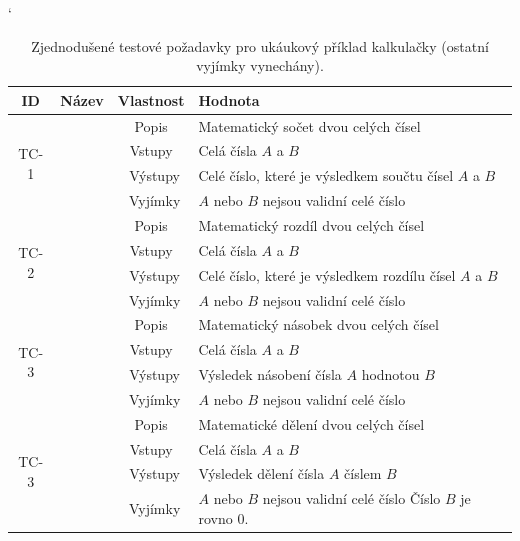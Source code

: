 \documentclass[czech, ma, kiv, he, iso690numb, pdf, viewonly]{fasthesis}
\begin{document}
    \begin{table}
        \catcode`
        \begin{tabular}{|c|c|c|p{7.5cm}|}
            \hline
            \textbf{ID} & \textbf{Název} & \textbf{Vlastnost} & \textbf{Hodnota} \\
            \hline
            \multirow{4}{*}{TC-1} & \multirow{4}{*}{Součet} & Popis & Matematický sočet dvou celých čísel \\
            \cline{3-4}
            & & Vstupy & Celá čísla \(A\) a \(B\) \\
            \cline{3-4}
            & & Výstupy & Celé číslo, které je výsledkem součtu čísel \(A\) a \(B\) \\
            \cline{3-4}
            & & Vyjímky & \(A\) nebo \(B\) nejsou validní celé číslo \\
            \hline
            \multirow{4}{*}{TC-2} & \multirow{4}{*}{Rozdíl} & Popis & Matematický rozdíl dvou celých čísel \\
            \cline{3-4}
            & & Vstupy & Celá čísla \(A\) a \(B\) \\
            \cline{3-4}
            & & Výstupy & Celé číslo, které je výsledkem rozdílu čísel \(A\) a \(B\) \\
            \cline{3-4}
            & & Vyjímky & \(A\) nebo \(B\) nejsou validní celé číslo \\
            \hline
            \multirow{4}{*}{TC-3} & \multirow{4}{*}{Násobení} & Popis & Matematický násobek dvou celých čísel \\
            \cline{3-4}
            & & Vstupy & Celá čísla \(A\) a \(B\) \\
            \cline{3-4}
            & & Výstupy & Výsledek násobení čísla \(A\) hodnotou \(B\) \\
            \cline{3-4}
            & & Vyjímky & \(A\) nebo \(B\) nejsou validní celé číslo \\
            \hline
            \multirow{4}{*}{TC-3} & \multirow{4}{*}{Dělení} & Popis & Matematické dělení dvou celých čísel \\
            \cline{3-4}
            & & Vstupy & Celá čísla \(A\) a \(B\) \\
            \cline{3-4}
            & & Výstupy & Výsledek dělení čísla \(A\) číslem \(B\) \\
            \cline{3-4}
            & & Vyjímky & \(A\) nebo \(B\) nejsou validní celé číslo \newline Číslo \(B\) je rovno \(0\). \\
            \hline
        \end{tabular}
        \centering
        \caption{Zjednodušené testové požadavky pro ukáukový příklad kalkulačky (ostatní vyjímky vynechány).}
        \label{tab:calc_tets_cases}
    \end{table}
\end{document}
